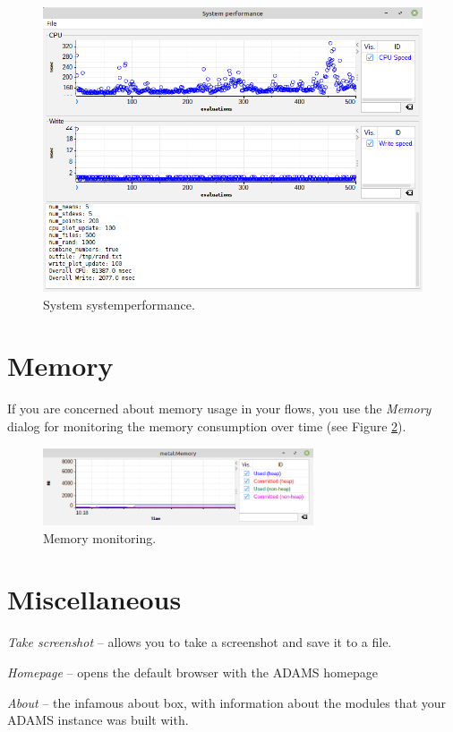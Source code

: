 \begin{figure}[htb]
  \centering
  \includegraphics[width=12.0cm]{images/systemperformance.png}
  \caption{System systemperformance.}
  \label{systemperformance}
\end{figure}

\newpage
\section{Memory}
If you are concerned about memory usage in your flows, you use the \textit{Memory}
dialog for monitoring the memory consumption over time (see Figure \ref{memory}).

\begin{figure}[htb]
  \centering
  \includegraphics[width=8.0cm]{images/memory.png}
  \caption{Memory monitoring.}
  \label{memory}
\end{figure}

\newpage
\section{Miscellaneous}
\begin{tight_itemize}
  \item \textit{Take screenshot} -- allows you to take a screenshot and save it
  to a file.
  \item \textit{Homepage} -- opens the default browser with the ADAMS homepage
  \item \textit{About} -- the infamous about box, with information about the
  modules that your ADAMS instance was built with.
\end{tight_itemize}

